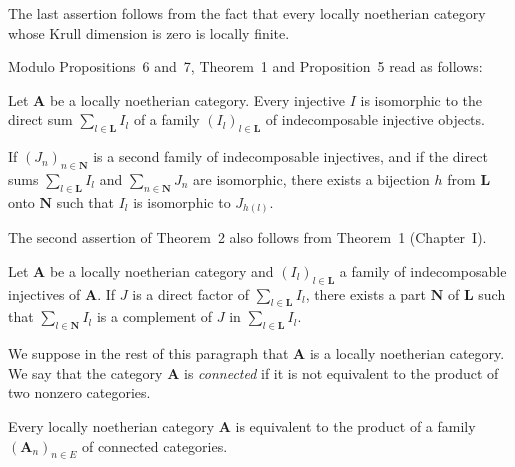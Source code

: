 The last assertion follows from the fact that every locally
noetherian category whose Krull dimension is zero is locally finite.

Modulo Propositions~6 and~7, Theorem~1 and Proposition~5 read as
follows:

\begin{theorem}
Let $\mathbf{A}$ be a locally noetherian category. Every injective
$I$ is isomorphic to the direct sum $\sum_{l\in\mathbf{L}} I_l$ of a
family $(I_l)_{l\in\mathbf{L}}$ of indecomposable injective objects.

If $(J_n)_{n\in\mathbf{N}}$ is a second family of indecomposable
injectives, and if the direct sums $\sum_{l\in\mathbf{L}} I_l$ and
$\sum_{n\in\mathbf{N}} J_n$ are isomorphic, there exists a bijection
$h$ from $\mathbf{L}$ onto $\mathbf{N}$ such that $I_l$ is isomorphic
to $J_{h(l)}$.
\end{theorem}

The second assertion of Theorem~2 also follows from Theorem~1
(Chapter~I).

\begin{proposition}
Let $\mathbf{A}$ be a locally noetherian category and
$(I_l)_{l\in\mathbf{L}}$ a family of indecomposable injectives of
$\mathbf{A}$. If $J$ is a direct factor of
$\sum_{l\in\mathbf{L}} I_l$, there exists a part $\mathbf{N}$ of
$\mathbf{L}$ such that $\sum_{l\in\mathbf{N}} I_l$ is a complement of
$J$ in $\sum_{l\in\mathbf{L}} I_l$.
\end{proposition}

We suppose in the rest of this paragraph that $\mathbf{A}$ is a
locally noetherian category. We say that the category $\mathbf{A}$ is
\emph{connected} if it is not equivalent to the product of two nonzero
categories.

\begin{unnumberedcorollary}
Every locally noetherian category $\mathbf{A}$ is equivalent to the
product of a family $(\mathbf{A}_n)_{n\in E}$ of connected categories.
\end{unnumberedcorollary}

